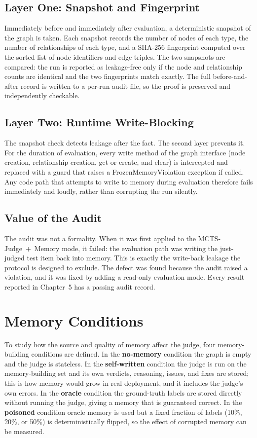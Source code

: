 \documentclass[14pt,a4paper]{extreport}
\begin{document}
\subsection{Layer One: Snapshot and Fingerprint}

Immediately before and immediately after evaluation, a deterministic snapshot of the graph is taken. Each snapshot records the number of nodes of each type, the number of relationships of each type, and a SHA-256 fingerprint computed over the sorted list of node identifiers and edge triples. The two snapshots are compared: the run is reported as leakage-free only if the node and relationship counts are identical and the two fingerprints match exactly. The full before-and-after record is written to a per-run audit file, so the proof is preserved and independently checkable.

\subsection{Layer Two: Runtime Write-Blocking}

The snapshot check detects leakage after the fact. The second layer prevents it. For the duration of evaluation, every write method of the graph interface (node creation, relationship creation, get-or-create, and clear) is intercepted and replaced with a guard that raises a FrozenMemoryViolation exception if called. Any code path that attempts to write to memory during evaluation therefore fails immediately and loudly, rather than corrupting the run silently.

\subsection{Value of the Audit}

The audit was not a formality. When it was first applied to the MCTS-Judge~+~Memory mode, it failed: the evaluation path was writing the just-judged test item back into memory. This is exactly the write-back leakage the protocol is designed to exclude. The defect was found because the audit raised a violation, and it was fixed by adding a read-only evaluation mode. Every result reported in Chapter~5 has a passing audit record.

\section{Memory Conditions}

To study how the source and quality of memory affect the judge, four memory-building conditions are defined. In the \textbf{no-memory} condition the graph is empty and the judge is stateless. In the \textbf{self-written} condition the judge is run on the memory-building set and its own verdicts, reasoning, issues, and fixes are stored; this is how memory would grow in real deployment, and it includes the judge's own errors. In the \textbf{oracle} condition the ground-truth labels are stored directly without running the judge, giving a memory that is guaranteed correct. In the \textbf{poisoned} condition oracle memory is used but a fixed fraction of labels (10\%, 20\%, or 50\%) is deterministically flipped, so the effect of corrupted memory can be measured.
\end{document}
